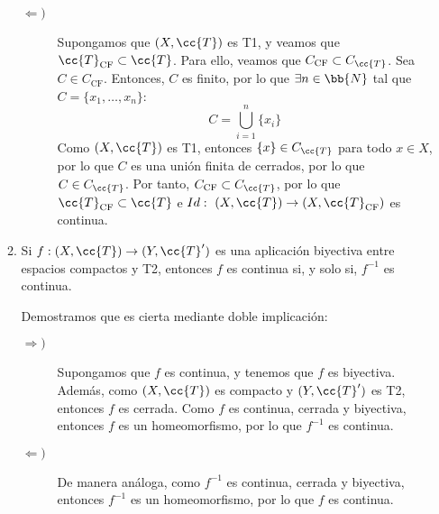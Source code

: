 \documentclass[12pt]{article}
\newcommand{\T}[0]{\cc{T}}
\begin{document}
\begin{ejercicio}[2.5 puntos]
\begin{enumerate}
\begin{enumerate}
\begin{description}
              \item[$\Longleftarrow)$] Supongamos que $(X,\T)$ es T1, y veamos que $\T_{\text{CF}} \subset \T$.
              Para ello, veamos que $C_{\text{CF}} \subset C_{\T}$. Sea $C\in C_{\text{CF}}$.
              Entonces, $C$ es finito, por lo que $\exists n\in \bb{N}$ tal que $C = \{x_1, \dots, x_n\}$:
              \begin{equation*}
                C = \bigcup_{i=1}^n \{x_i\}
              \end{equation*}
              Como $(X,\T)$ es T1, entonces $\{x\}\in C_{\T}$ para todo $x\in X$, por lo que $C$ es una unión finita
              de cerrados, por lo que $C\in C_{\T}$. Por tanto, $C_{\text{CF}} \subset C_{\T}$,
              por lo que $\T_{\text{CF}} \subset \T$ e $Id:~(X, \T) \to (X, \T_{\text{CF}})$ es continua.
            \end{description}

            \item Si $f : (X, \T) \to (Y, \T')$ es una aplicación biyectiva entre espacios compactos y T2, entonces $f$ es continua si, y solo si, $f^{-1}$ es continua.
            
            Demostramos que es cierta mediante doble implicación:
            \begin{description}
              \item[$\Longrightarrow)$] Supongamos que $f$ es continua, y tenemos que $f$ es biyectiva.
              Además, como $(X,\T)$ es compacto y $(Y,\T')$ es T2, entonces $f$ es cerrada.
              Como $f$ es continua, cerrada y biyectiva, entonces $f$ es un homeomorfismo, por lo que $f^{-1}$ es continua.

              \item[$\Longleftarrow)$] De manera análoga, como $f^{-1}$ es continua, cerrada y biyectiva, entonces $f^{-1}$ es un homeomorfismo, por lo que $f$ es continua.            \end{description}
          \end{enumerate}
        \end{enumerate}
    \end{ejercicio}
        
\end{document}
